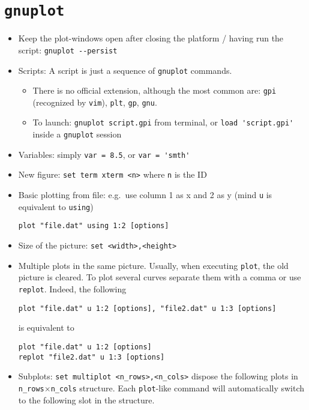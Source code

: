 \documentclass[a4paper,12pt,%
              final%
              ]{article}
\begin{document}
\section{\texttt{gnuplot}}
\begin{itemize}
  \item Keep the plot-windows open after closing the platform / having run the script: \verb|gnuplot --persist|
  \item Scripts: A script is just a sequence of \texttt{gnuplot} commands.
    \begin{itemize}
      \item There is no official extension, although the most common are: \texttt{gpi} (recognized by \texttt{vim}), \texttt{plt}, \texttt{gp}, \texttt{gnu}.
      \item To launch: \verb|gnuplot script.gpi| from terminal, or \verb|load 'script.gpi'| inside a \verb|gnuplot| session
    \end{itemize}
  \item Variables: simply \verb|var = 8.5|, or \verb|var = 'smth'|
  \item New figure: \verb|set term xterm <n>| where \verb|n| is the ID
  \item Basic plotting from file: e.g.\ use column 1 as x and 2 as y (mind \texttt{u} is equivalent to \texttt{using})
\begin{verbatim}
plot "file.dat" using 1:2 [options]
\end{verbatim}
  \item Size of the picture: \verb|set <width>,<height>|
  \item Multiple plots in the same picture. Usually, when executing \texttt{plot}, the old picture is cleared. To plot several curves separate them with a comma or use \verb|replot|. Indeed, the following
\begin{verbatim}
plot "file.dat" u 1:2 [options], "file2.dat" u 1:3 [options]
\end{verbatim}
    is equivalent to
\begin{verbatim}
plot "file.dat" u 1:2 [options]
replot "file2.dat" u 1:3 [options]
\end{verbatim}
  \item Subplots: \verb|set multiplot <n_rows>,<n_cols>| dispose the following plots in \verb|n_rows|$\times$\verb|n_cols| structure. Each \verb|plot|-like command will automatically switch to the following slot in the structure.

\end{itemize}
\end{document}
